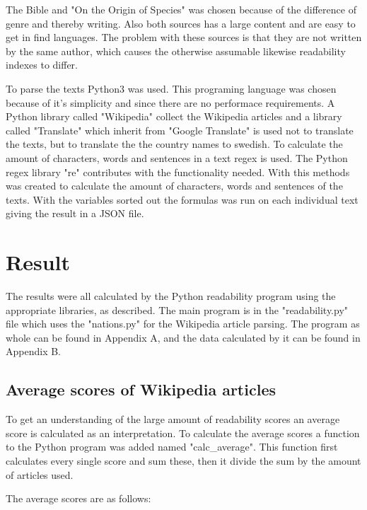 \documentclass[a4paper]{article}
\begin{document}
The Bible and "On the Origin of Species" was chosen because of the difference of genre and thereby writing. Also both sources has a large content and are easy to get in find languages. The problem with these sources is that they are not written by the same author, which causes the otherwise assumable likewise readability indexes to differ.

To parse the texts Python3 was used. This programing language was chosen because of it's simplicity and since there are no performace requirements. A Python library called "Wikipedia" collect the Wikipedia articles and a library called "Translate" which inherit from "Google Translate" is used not to translate the texts, but to translate the the country names to swedish. To calculate the amount of characters, words and sentences in a text regex is used. The Python regex library "re" contributes with the functionality needed. With this methods was created to calculate the amount of characters, words and sentences of the texts. With the variables sorted out the formulas was run on each individual text giving the result in a JSON file.


\section{Result}
The results were all calculated by the Python readability program using the appropriate libraries, as described. The main program is in the "readability.py" file which uses the "nations.py" for the Wikipedia article parsing. The program as whole can be found in Appendix A, and the data calculated by it can be found in Appendix B. 

\subsection{Average scores of Wikipedia articles}
To get an understanding of the large amount of readability scores an average score is calculated as an interpretation. To calculate the average scores a function to the Python program was added named "calc\_average". This function first calculates every single score and sum these, then it divide the sum by the amount of articles used.

The average scores are as follows:
\end{document}
